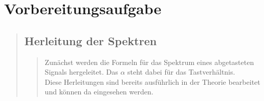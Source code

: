 \section{Vorbereitungsaufgabe}
\begin{quote}
    \subsection{Herleitung der Spektren}
    \begin{quote}
        Zunächst werden die Formeln für das Spektrum eines abgetasteten Signals
        hergeleitet. Das $\alpha$ steht dabei für das Tastverhältnis.\\
        Diese Herleitungen sind bereits ausführlich in der Theorie bearbeitet
        und können da eingesehen werden.
        
        

\end{quote}
\end{quote}
